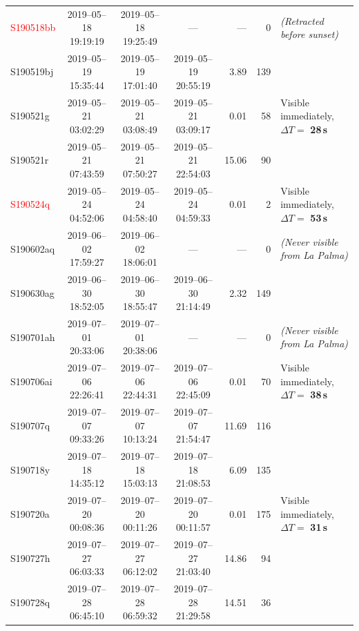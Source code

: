\begin{colsection}
\begin{table}
\begin{footnotesize}
\begin{center}
\begin{tabular}{l|cccrrl}
            \textcolor{Red}{S190518bb} & 2019--05--18 19:19:19 & 2019--05--18 19:25:49 & ---                   &   --- &   0 & \textit{(Retracted before sunset)}\\
                            S190519bj  & 2019--05--19 15:35:44 & 2019--05--19 17:01:40 & 2019--05--19 20:55:19 &  3.89 & 139 & \\
                            S190521g   & 2019--05--21 03:02:29 & 2019--05--21 03:08:49 & 2019--05--21 03:09:17 &  0.01 &  58 & Visible immediately, $\Delta T=$ \textbf{28\,s}\\
                            S190521r   & 2019--05--21 07:43:59 & 2019--05--21 07:50:27 & 2019--05--21 22:54:03 & 15.06 &  90 & \\
            \textcolor{Red}{S190524q}  & 2019--05--24 04:52:06 & 2019--05--24 04:58:40 & 2019--05--24 04:59:33 &  0.01 &   2 & Visible immediately, $\Delta T=$ \textbf{53\,s}\\
                            S190602aq  & 2019--06--02 17:59:27 & 2019--06--02 18:06:01 & ---                   &   --- &   0 & \textit{(Never visible from La Palma)}\\
                            S190630ag  & 2019--06--30 18:52:05 & 2019--06--30 18:55:47 & 2019--06--30 21:14:49 &  2.32 & 149 & \\
                            S190701ah  & 2019--07--01 20:33:06 & 2019--07--01 20:38:06 & ---                   &   --- &   0 & \textit{(Never visible from La Palma)}\\
                            S190706ai  & 2019--07--06 22:26:41 & 2019--07--06 22:44:31 & 2019--07--06 22:45:09 &  0.01 &  70 & Visible immediately, $\Delta T=$ \textbf{38\,s}\\
                            S190707q   & 2019--07--07 09:33:26 & 2019--07--07 10:13:24 & 2019--07--07 21:54:47 & 11.69 & 116 & \\
                            S190718y   & 2019--07--18 14:35:12 & 2019--07--18 15:03:13 & 2019--07--18 21:08:53 &  6.09 & 135 & \\
                            S190720a   & 2019--07--20 00:08:36 & 2019--07--20 00:11:26 & 2019--07--20 00:11:57 &  0.01 & 175 & Visible immediately, $\Delta T=$ \textbf{31\,s}\\
                            S190727h   & 2019--07--27 06:03:33 & 2019--07--27 06:12:02 & 2019--07--27 21:03:40 & 14.86 &  94 & \\
                            S190728q   & 2019--07--28 06:45:10 & 2019--07--28 06:59:32 & 2019--07--28 21:29:58 & 14.51 &  36 & \\

\end{tabular}
\end{center}
\end{footnotesize}
\end{table}
\end{colsection}
